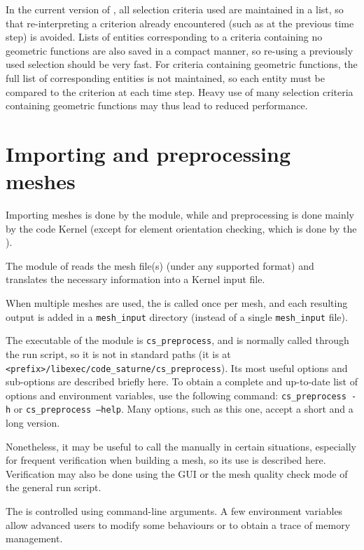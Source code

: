{{{{In the current version of \CS, all selection criteria used
are maintained in a list, so that re-interpreting a criterion already
encountered (such as at the previous time step) is avoided.
Lists of entities corresponding to a criteria containing no geometric
functions are also saved in a compact manner, so re-using a previously
used selection should be very fast. For criteria containing geometric
functions, the full list of corresponding entities is not maintained,
so each entity must be compared to the criterion at each time step.
Heavy use of many selection criteria containing geometric functions
may thus lead to reduced performance.

\section{Importing and preprocessing meshes}

Importing meshes is done by the \pcs module, while and preprocessing
is done mainly by the code Kernel (except for element orientation
checking, which is done by the \pcs).

The \pcs module of \CS reads the
mesh file(s) (under any supported format) and translates the necessary
information into a Kernel input file.

When multiple meshes are used, the \pcs is called once per mesh,
and each resulting output is added in a \texttt{mesh\_input}
directory (instead of a single \texttt{mesh\_input} file).

The executable of the \pcs module is \texttt{cs\_preprocess}, and
is normally called through the run script, so it is not in standard paths
(it is at \texttt{<prefix>/libexec/code\_saturne/cs\_preprocess}).
Its most useful options and sub-options are described briefly here.
To obtain a complete and up-to-date list of options and environment
variables, use the following command:
\texttt{cs\_preprocess~-h} or \texttt{cs\_preprocess~--help}.
Many options, such as this one, accept a short and a long version.

Nonetheless, it may be useful to call the \pcs manually
in certain situations, especially for frequent verification when
building a mesh, so its use is described here. Verification
may also be done using the GUI or the mesh quality check mode
of the general run script.

The \pcs is controlled using command-line arguments.
A few environment variables allow advanced users to modify
some behaviours or to obtain a trace of memory management.

}}}}
